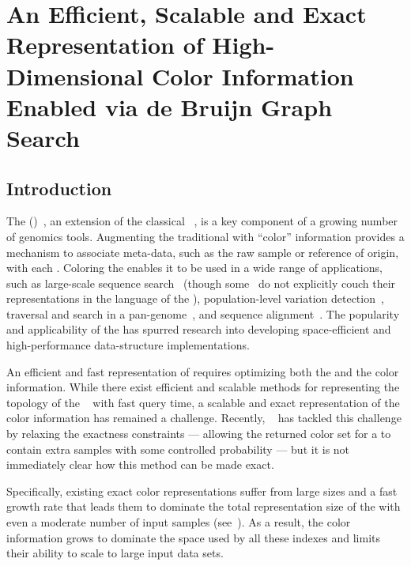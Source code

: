 \chapter{An Efficient, Scalable and Exact Representation of High-Dimensional Color Information Enabled via de Bruijn Graph Search}
\label{sec:mantis}


\section{Introduction}\label{sec:intro}

The \longcdbg (\cdbg)~\cite{IqbalCaTu12}, an extension of the classical
\dbg~\citep{pevzner2001eulerian,pevzner2001fragment,chikhi2014representation},
is a key component of a growing number of genomics tools. Augmenting the traditional
\dbg with ``color'' information provides a mechanism to associate meta-data,
such as the raw sample or reference of origin, with each \kmer. Coloring the \dbg
enables it to be used in a wide range of applications, such as large-scale sequence
search~\citep{mantis, Solomon2016Fast, Solomon2017Improved,
Sun2017Allsome, bradley2017real} (though some~\citep{Solomon2016Fast, Solomon2017Improved,Sun2017Allsome}
do not explicitly couch their representations in
the language of the \cdbg), population-level variation
detection~\cite{MuggliBoNo17, holley2016bloom, rainbowfish}, traversal and search
in a pan-genome~\cite{holley2016bloom}, and sequence
alignment~\cite{liu2016debga}. The popularity and applicability of the
\cdbg has spurred research into developing space-efficient and high-performance
data-structure implementations.

An efficient and fast representation of \cdbg requires optimizing both the \dbg and the
color information.  While there exist efficient and scalable methods
for representing the topology of the
\dbg~\cite{chikhi2012space,salikhov2014using,bowe2012succinct,chikhi2014representation,crawford2018practical,PandeyBeJo2017d}
with fast query time, a scalable and exact representation of the color
information has remained a challenge. Recently, ~\citet{doi:10.1093/bioinformatics/bty632}
has tackled this challenge by relaxing the exactness
constraints --- allowing the returned color set for a \kmer to contain extra
samples with some controlled probability --- but it is not immediately clear how
this method can be made exact.

Specifically,  existing exact color representations suffer from large
sizes and a fast growth rate that leads them to dominate the total
representation size of the \cdbg with even a moderate number of input
samples (see~).  As a result, the color information grows to
dominate the space used by all these indexes and limits their ability to scale
to large input data sets.

